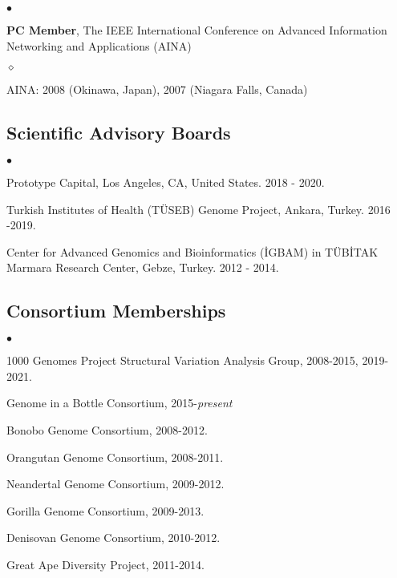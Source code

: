 \documentclass[margin,line]{res}
\newenvironment{list2}{
  \begin{list}{$\bullet$}{%
      \setlength{\itemsep}{0.1cm}
      \setlength{\parsep}{0in} \setlength{\parskip}{0in}
      \setlength{\topsep}{0in} \setlength{\partopsep}{0in} 
      \setlength{\leftmargin}{0.2in}}}{\end{list}}
\newenvironment{list3}{
  \begin{list}{$\diamond$}{%
      \setlength{\itemsep}{0in}
      \setlength{\parsep}{0.1cm} \setlength{\parskip}{0.1cm}
      \setlength{\topsep}{0.1cm} \setlength{\partopsep}{0.1cm} 
      \setlength{\leftmargin}{0.2in}}}{\end{list}}
\begin{document}
\begin{resume}
\begin{list2}
\item
  \textbf{PC Member}, The IEEE International Conference on
  Advanced Information Networking and Applications (AINA)
  \begin{list3}
  \item AINA: 2008 (Okinawa, Japan), 2007 (Niagara Falls, Canada)
  \end{list3}

\end{list2}

\vspace{-0.4cm}
\subsection{\small \sc Scientific Advisory Boards}
\begin{list2}
\item
  Prototype Capital, Los Angeles, CA, United States. 2018 - 2020.
\item
  Turkish Institutes of Health (TÜSEB) Genome Project, Ankara, Turkey. 2016 -2019.
\item
  Center for Advanced Genomics and Bioinformatics (\.{I}GBAM)
  in T\"{U}B\.{I}TAK Marmara Research Center, Gebze, Turkey. 2012 - 2014.
\end{list2}

\vspace{-0.4cm}
\subsection{\small \sc Consortium Memberships}

\begin{list2}
\item
  1000 Genomes Project Structural Variation Analysis Group, 2008-2015, 2019-2021.
  \item
  Genome in a Bottle Consortium, 2015-{\it present}
\item
  Bonobo Genome Consortium, 2008-2012.
\item
  Orangutan Genome Consortium, 2008-2011.
\item
  Neandertal Genome Consortium, 2009-2012.
\item
  Gorilla Genome Consortium, 2009-2013.
\item
  Denisovan Genome Consortium, 2010-2012.
\item
  Great Ape Diversity Project, 2011-2014.
\end{list2}



\end{resume}
\end{document}
